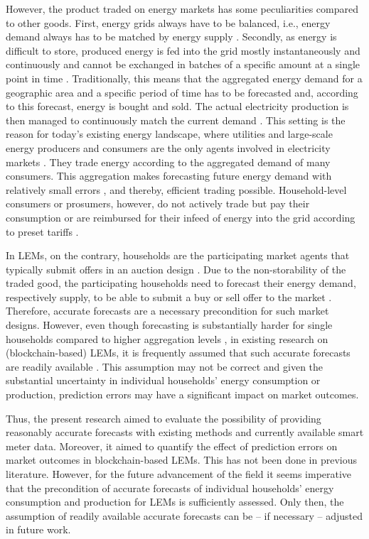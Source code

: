 However, the product traded on energy markets has some peculiarities compared to other goods. First, energy grids always have to be balanced, i.e., energy demand always has to be matched by energy supply \citep{Weron:2006}. Secondly, as energy is difficult to store, produced energy is fed into the grid mostly instantaneously and continuously and cannot be exchanged in batches of a specific amount at a single point in time \citep{Rosen:2013}. Traditionally, this means that the aggregated energy demand for a geographic area and a specific period of time has to be forecasted and, according to this forecast, energy is bought and sold. The actual electricity production is then managed to continuously match the current demand \citep{Rosen:2013}. This setting is the reason for today's existing energy landscape, where utilities and large-scale energy producers and consumers are the only agents involved in electricity markets \citep{Weron:2006, Buchmann:2013}. They trade energy according to the aggregated demand of many consumers. This aggregation makes forecasting future energy demand with relatively small errors \citep{Meer:2018, Wang:2018}, and thereby, efficient trading possible. Household-level consumers or prosumers, however, do not actively trade but pay their consumption or are reimbursed for their infeed of energy into the grid according to preset tariffs \citep{Rosen:2013}. 

In LEMs, on the contrary, households are the participating market agents that typically submit offers in an auction design \citep{Ilic:2012, Lamparter:2010}. Due to the non-storability of the traded good, the participating households need to forecast their energy demand, respectively supply, to be able to submit a buy or sell offer to the market \citep{Rosen:2013}. Therefore, accurate forecasts are a necessary precondition for such market designs. However, even though forecasting is substantially harder for single households compared to higher aggregation levels \citep{Wang:2018}, in existing research on (blockchain-based) LEMs, it is frequently assumed that such accurate forecasts are readily available \citep{Rosen:2013, Mengelkamp:2018c, Lamparter:2010, Buchmann:2013, Mengelkamp:2018a}. This assumption may not be correct and given the substantial uncertainty in individual households' energy consumption or production, prediction errors may have a significant impact on market outcomes.

Thus, the present research aimed to evaluate the possibility of providing reasonably accurate forecasts with existing methods and currently available smart meter data. Moreover, it aimed to quantify the effect of prediction errors on market outcomes in blockchain-based LEMs. This has not been done in previous literature. However, for the future advancement of the field it seems imperative that the precondition of accurate forecasts of individual households' energy consumption and production for LEMs is sufficiently assessed. Only then, the assumption of readily available accurate forecasts can be -- if necessary -- adjusted in future work.

